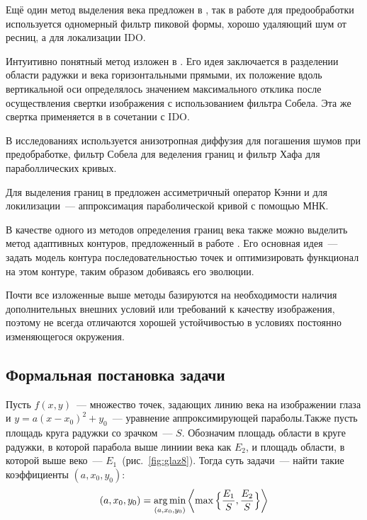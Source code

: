 \documentclass[12pt,a4paper]{article} %
\begin{document}
Ещё один метод выделения века предложен в \cite{KKX}, так в работе для предообработки используется одномерный фильтр пиковой формы, хорошо удаляющий шум от ресниц, а для локализации IDO.

Интуитивно понятный метод изложен в \cite{Masek}. Его идея заключается в разделении области радужки и века горизонтальными прямыми, их положение вдоль вертикальной оси определялось значением максимального отклика после осуществления свертки изображения с использованием фильтра Собела. Эта же свертка применяется в \cite{KP} в сочетании с IDO. 

В исследованиях \cite{Adam_2, Adam_1} используется анизотропная диффузия для погашения шумов при предобработке, фильтр Собела для веделения границ и фильтр Хафа для параболлических кривых. 

Для выделения границ в \cite{Yang} предложен ассиметричный оператор Кэнни и для локилизации~--- аппроксимация параболической кривой с помощью МНК. 

В качестве одного из методов определения границ века также можно выделить метод адаптивных контуров, предложенный в работе \cite{Smirn}. Его основная идея~--- задать модель контура последовательностью точек и оптимизировать функционал на этом контуре, таким образом добиваясь его эволюции.

Почти все изложенные выше методы базируются на необходимости наличия дополнительных внешних условий или требований к качеству изображения, поэтому не всегда отличаются хорошей устойчивостью в условиях постоянно изменяющегося окружения. 

\subsection{Формальная постановка задачи}

Пусть $f(x, y)$~--- множество точек, задающих линию века на изображении глаза и
\newline $y=a(x-x_0)^2 + y_0$~--- уравнение аппроксимирующей параболы.Также пусть площадь круга радужки со зрачком~--- $S$.
Обозначим площадь области в круге радужки, в которой парабола выше линиии века как $E_2$, и площадь области, в которой выше веко~--- $E_1$~(рис.~\ref{fig:glaz8}). Тогда суть задачи~--- найти такие коэффициенты $(a,x_0,y_0)$:
\begin{gather}\label{minimax}
	(a,x_0, y_0)=\mathop{\rm arg\,min}\limits_{(a,x_0,y_0)}\left<\max{\Bigl\{\frac{E_1}{S}, \frac{E_2}{S}\Bigr\}}\right>
\end{gather}
\end{document}
